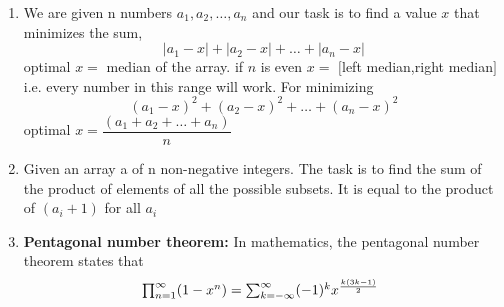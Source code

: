 \begin{enumerate}[resume]
          \[\displaystyle p(x) = a_nx^n + a_{n - 1}x^{n - 1} + \dots + a_1x + a_0\]
          (with the coefficients being real or complex numbers and $\displaystyle a_n \neq 0$) is known by the fundamental theorem of algebra to have $n$ (not necessarily distinct) complex roots $r_1, r_2,\dots, r_n$.
          \[\begin{cases}
                  \text{$r_1 + r_2 + \dots + r_{n - 1} + r_n = - \frac{a_{n - 1}}{a_n}$}
                  \\
                  \begin{array}{@{}l}
                      (r_1r_2 + r_1r_3 + \dots + r_1r_n)           \\
                      + (r_2r_3 + r_2r_4 + \dots + r_2r_n) + \dots \\
                      + r_{n-1}r_n
                      = \dfrac{a_{n-2}}{a_n}
                  \end{array}
                  \\\vdots\\
                  \text{$r_1r_2\dots r_n = (-1)^n\frac{a_0}{a_n}.$}
              \end{cases}\]
          Vieta’s formulas can equivalently be written as
          \[\displaystyle \sum_{1 \leq i_1 < i_2 < \dots <i_k \leq n} \Bigg(\prod_{j = 1}^k{r_{i_j}}\Bigg) = (-1)^k\frac{a_{n - k}}{a_n},\]
    \item We are given n numbers $\displaystyle a_1,a_2,\dots,a_n$ and our task is to find a value $\displaystyle x$ that minimizes the sum,
          \[|a_1 - x| + |a_2 - x| + \dots + |a_n - x|\]
          optimal $\displaystyle x=$ median of the array.
          if $n$ is even $\displaystyle x =$ $[$left median,right median$]$ i.e. every number in this range will work.
          For minimizing
          \[\displaystyle (a_1 - x)^2 + (a_2 - x)^2 + \dots + (a_n - x)^2\]
          optimal $\displaystyle x = \dfrac{(a_1 + a_2 + \dots + a_n)}{ n}$
    \item Given an array a of n non-negative integers. The task is to find the sum of the product of elements of all the possible subsets. It is equal to the product of $\displaystyle (a_i + 1)$ for all $\displaystyle a_i$
    \item \textbf{Pentagonal number theorem:}
          In mathematics, the pentagonal number theorem states that
          \[
              \begin{array}{@{}l}
                  \prod_{n=1}^{\infty} (1 - x^n)
                  = \sum_{k=-\infty}^{\infty} (-1)^k x^{\frac{k(3k-1)}{2}} \\

\end{array}\]
\end{enumerate}
